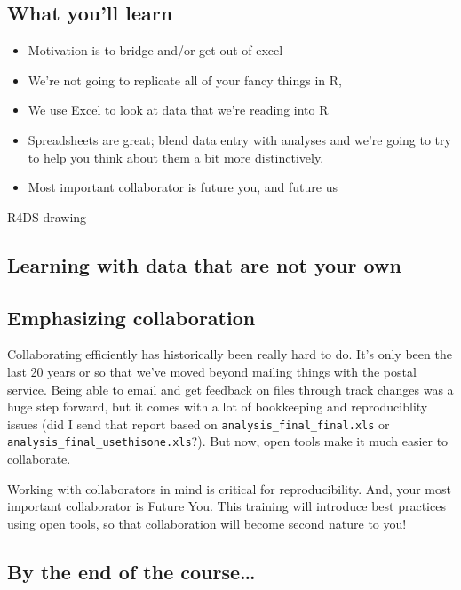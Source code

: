 \documentclass[]{book}
\providecommand{\tightlist}{%
  \setlength{\itemsep}{0pt}\setlength{\parskip}{0pt}}
\begin{document}
\hypertarget{what-youll-learn}{%
\subsection{What you'll learn}\label{what-youll-learn}}

\begin{itemize}
\tightlist
\item
  Motivation is to bridge and/or get out of excel
\item
  We're not going to replicate all of your fancy things in R,
\item
  We use Excel to look at data that we're reading into R
\item
  Spreadsheets are great; blend data entry with analyses and we're going to try to help you think about them a bit more distinctively.
\item
  Most important collaborator is future you, and future us
\end{itemize}

R4DS drawing

\hypertarget{learning-with-data-that-are-not-your-own}{%
\subsection{Learning with data that are not your own}\label{learning-with-data-that-are-not-your-own}}

\hypertarget{emphasizing-collaboration}{%
\subsection{Emphasizing collaboration}\label{emphasizing-collaboration}}

Collaborating efficiently has historically been really hard to do. It's only been the last 20 years or so that we've moved beyond mailing things with the postal service. Being able to email and get feedback on files through track changes was a huge step forward, but it comes with a lot of bookkeeping and reproduciblity issues (did I send that report based on \texttt{analysis\_final\_final.xls} or \texttt{analysis\_final\_usethisone.xls}?). But now, open tools make it much easier to collaborate.

Working with collaborators in mind is critical for reproducibility. And, your most important collaborator is Future You. This training will introduce best practices using open tools, so that collaboration will become second nature to you!

\hypertarget{by-the-end-of-the-course}{%
\subsection{By the end of the course\ldots{}}\label{by-the-end-of-the-course}}
\end{document}

